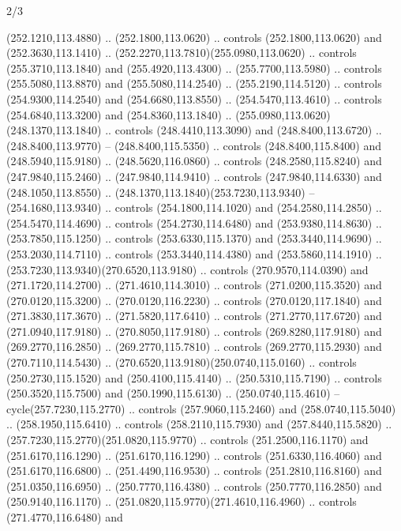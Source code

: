 \begin{flagdescription}{2/3}
\begin{scope}[xshift=0.5\flaglength,yshift=0.5\flagwidth,scale=\flagwidth/259.2]
\begin{scope}[y=0.8pt, x=0.8pt, yscale=-1,shift={(-243,-162)}]
      (252.1210,113.4880) .. (252.1800,113.0620) .. controls (252.1800,113.0620) and
      (252.3630,113.1410) .. (252.2270,113.7810)(255.0980,113.0620) .. controls
      (255.3710,113.1840) and (255.4920,113.4300) .. (255.7700,113.5980) .. controls
      (255.5080,113.8870) and (255.5080,114.2540) .. (255.2190,114.5120) .. controls
      (254.9300,114.2540) and (254.6680,113.8550) .. (254.5470,113.4610) .. controls
      (254.6840,113.3200) and (254.8360,113.1840) ..
      (255.0980,113.0620)(248.1370,113.1840) .. controls (248.4410,113.3090) and
      (248.8400,113.6720) .. (248.8400,113.9770) -- (248.8400,115.5350) .. controls
      (248.8400,115.8400) and (248.5940,115.9180) .. (248.5620,116.0860) .. controls
      (248.2580,115.8240) and (247.9840,115.2460) .. (247.9840,114.9410) .. controls
      (247.9840,114.6330) and (248.1050,113.8550) ..
      (248.1370,113.1840)(253.7230,113.9340) -- (254.1680,113.9340) .. controls
      (254.1800,114.1020) and (254.2580,114.2850) .. (254.5470,114.4690) .. controls
      (254.2730,114.6480) and (253.9380,114.8630) .. (253.7850,115.1250) .. controls
      (253.6330,115.1370) and (253.3440,114.9690) .. (253.2030,114.7110) .. controls
      (253.3440,114.4380) and (253.5860,114.1910) ..
      (253.7230,113.9340)(270.6520,113.9180) .. controls (270.9570,114.0390) and
      (271.1720,114.2700) .. (271.4610,114.3010) .. controls (271.0200,115.3520) and
      (270.0120,115.3200) .. (270.0120,116.2230) .. controls (270.0120,117.1840) and
      (271.3830,117.3670) .. (271.5820,117.6410) .. controls (271.2770,117.6720) and
      (271.0940,117.9180) .. (270.8050,117.9180) .. controls (269.8280,117.9180) and
      (269.2770,116.2850) .. (269.2770,115.7810) .. controls (269.2770,115.2930) and
      (270.7110,114.5430) .. (270.6520,113.9180)(250.0740,115.0160) .. controls
      (250.2730,115.1520) and (250.4100,115.4140) .. (250.5310,115.7190) .. controls
      (250.3520,115.7500) and (250.1990,115.6130) .. (250.0740,115.4610) --
      cycle(257.7230,115.2770) .. controls (257.9060,115.2460) and
      (258.0740,115.5040) .. (258.1950,115.6410) .. controls (258.2110,115.7930) and
      (257.8440,115.5820) .. (257.7230,115.2770)(251.0820,115.9770) .. controls
      (251.2500,116.1170) and (251.6170,116.1290) .. (251.6170,116.1290) .. controls
      (251.6330,116.4060) and (251.6170,116.6800) .. (251.4490,116.9530) .. controls
      (251.2810,116.8160) and (251.0350,116.6950) .. (250.7770,116.4380) .. controls
      (250.7770,116.2850) and (250.9140,116.1170) ..
      (251.0820,115.9770)(271.4610,116.4960) .. controls (271.4770,116.6480) and

\end{scope}
\end{scope}
\end{flagdescription}
